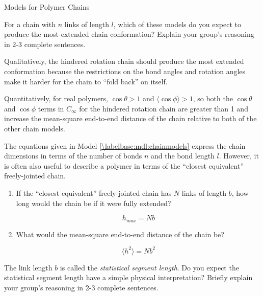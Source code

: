 \begin{activity}{Models for Polymer Chains}
\begin{ctqs}
	\question For a chain with $n$ links of length $l$, which of these models do you expect to produce the most extended chain conformation?  Explain your group's reasoning in 2-3 complete sentences. \label{\labelbase:ctq:stiffness}
	
		\begin{solution}[1.5in]
			Qualitatively, the hindered rotation chain should produce the most extended conformation because the restrictions on the bond angles and rotation angles make it harder for the chain to ``fold back'' on itself.
			
			Quantitatively, for real polymers, $\cos\theta > 1$ and $\langle \cos\phi \rangle > 1$, so both the $\cos \theta$ and $\cos \phi$ terms in $C_\infty$ for the hindered rotation chain are greater than 1 and increase the mean-square end-to-end distance of the chain relative to both of the other chain models.
		\end{solution}

	
	\question The equations given in Model \ref{\labelbase:mdl:chainmodels} express the chain dimensions in terms of the number of bonds $n$ and the bond length $l$.  However, it is often also useful to describe a polymer in terms of the ``closest equivalent'' freely-jointed chain. \label{\labelbase:ctq:statseg}
	
		\begin{enumerate}
			\item  If the ``closest equivalent'' freely-jointed chain has $N$ links of length $b$, how long would the chain be if it were fully extended? \label{\labelbase:ctq:Nb}
	
		\begin{solution}[0.75in]
			\begin{equation*}
				h_{max} = Nb
			\end{equation*}
		\end{solution}
			
			\item What would the mean-square end-to-end distance of the chain be? \label{\labelbase:ctq:Nb2}
	
		\begin{solution}[0.75in]
			\begin{equation*}
				\langle h^2 \rangle = Nb^2
			\end{equation*}
		\end{solution}
		
		\end{enumerate}
		
	\question The link length $b$ is called the \emph{statistical segment length}.  Do you expect the statistical segment length have a simple physical interpretation?  Briefly explain your group's reasoning in 2-3 complete sentences.\label{\labelbase:exc:statseginterp}
	

\end{ctqs}
\end{activity}
